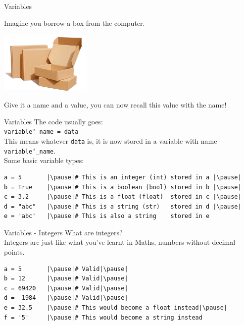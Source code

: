 \documentclass[dvipsnames, svgnames, x11names, handout]{beamer}
\begin{document}
\begin{frame}[fragile]{Variables}
\begin{center}
Imagine you borrow a box from the computer.

\includegraphics[height=3cm]{box}

\pause
Give it a name and a value, you can now recall this value with the name!
\end{center}
\end{frame}

\begin{frame}[fragile]{Variables}
The code usually goes:\\
\texttt{variable\char`\_name = data}\\
This means whatever \texttt{data} is, it is now stored in a variable with name \texttt{variable\char`\_name}.
\vspace{1em}\\
Some basic variable types:
\begin{verbatim}
a = 5       |\pause|# This is an integer (int) stored in a |\pause|
b = True    |\pause|# This is a boolean (bool) stored in b |\pause|
c = 3.2     |\pause|# This is a float (float)  stored in c |\pause|
d = "abc"   |\pause|# This is a string (str)   stored in d |\pause|
e = 'abc'   |\pause|# This is also a string    stored in e
\end{verbatim}
\end{frame}

\begin{frame}[fragile]{Variables - Integers}
What are integers?\pause\\
Integers are just like what you've learnt in Maths, numbers without decimal points.\pause
\begin{verbatim}
a = 5       |\pause|# Valid|\pause|
b = 12      |\pause|# Valid|\pause|
c = 69420   |\pause|# Valid|\pause|
d = -1984   |\pause|# Valid|\pause|
e = 32.5    |\pause|# This would become a float instead|\pause|
f = '5'     |\pause|# This would become a string instead
\end{verbatim}
\end{frame}
\end{document}
